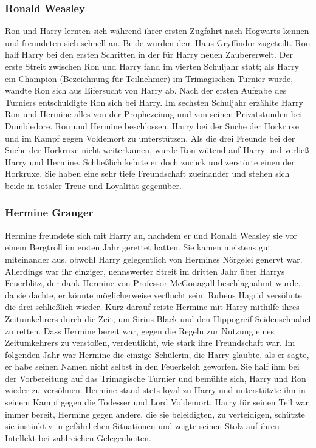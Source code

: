 \documentclass[a4paper, 10pt]{article}
\begin{document}
\subsubsection*{\large Ronald Weasley}
Ron und Harry lernten sich während ihrer ersten Zugfahrt nach Hogwarts kennen und freundeten sich schnell an. Beide wurden dem Haus Gryffindor zugeteilt. Ron half Harry bei den ersten Schritten in der für Harry neuen Zaubererwelt. Der erste Streit zwischen Ron und Harry fand im vierten Schuljahr statt; als Harry ein Champion (Bezeichnung für Teilnehmer) im Trimagischen Turnier wurde, wandte Ron sich aus Eifersucht von Harry ab. Nach der ersten Aufgabe des Turniers entschuldigte Ron sich bei Harry. Im sechsten Schuljahr erzählte Harry Ron und Hermine alles von der Prophezeiung und von seinen Privatstunden bei Dumbledore. Ron und Hermine beschlossen, Harry bei der Suche der Horkruxe und im Kampf gegen Voldemort zu unterstützen. Als die drei Freunde bei der Suche der Horkruxe nicht weiterkamen, wurde Ron wütend auf Harry und verließ Harry und Hermine. Schließlich kehrte er doch zurück und zerstörte einen der Horkruxe. Sie haben eine sehr tiefe Freundschaft zueinander und stehen sich beide in totaler Treue und Loyalität gegenüber.
\subsubsection*{\large Hermine Granger}
Hermine freundete sich mit Harry an, nachdem er und Ronald Weasley sie vor einem Bergtroll im ersten Jahr gerettet hatten. Sie kamen meistens gut miteinander aus, obwohl Harry gelegentlich von Hermines Nörgelei genervt war. Allerdings war ihr einziger, nennswerter Streit im dritten Jahr über Harrys Feuerblitz, der dank Hermine von Professor McGonagall beschlagnahmt wurde, da sie dachte, er könnte möglicherweise verflucht sein. Rubeus Hagrid versöhnte die drei schließlich wieder. Kurz darauf reiste Hermine mit Harry mithilfe ihres Zeitumkehrers durch die Zeit, um Sirius Black und den Hippogreif Seidenschnabel zu retten. Dass Hermine bereit war, gegen die Regeln zur Nutzung eines Zeitumkehrers zu verstoßen, verdeutlicht, wie stark ihre Freundschaft war. Im folgenden Jahr war Hermine die einzige Schülerin, die Harry glaubte, als er sagte, er habe seinen Namen nicht selbst in den Feuerkelch geworfen. Sie half ihm bei der Vorbereitung auf das Trimagische Turnier und bemühte sich, Harry und Ron wieder zu versöhnen.
\vspace{10pt}
\newline
Hermine stand stets loyal zu Harry und unterstützte ihn in seinem Kampf gegen die Todesser und Lord Voldemort.
\vspace{10pt}
\newline
Harry für seinen Teil war immer bereit, Hermine gegen andere, die sie beleidigten, zu verteidigen, schützte sie instinktiv in gefährlichen Situationen und zeigte seinen Stolz auf ihren Intellekt bei zahlreichen Gelegenheiten.
\end{document}
